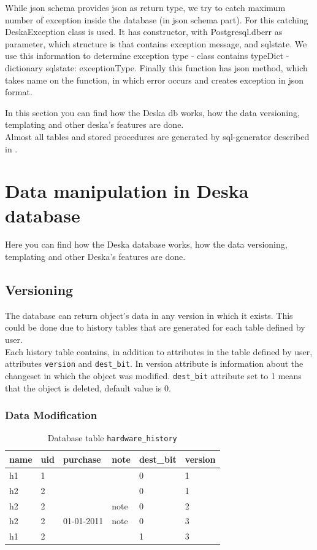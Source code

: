 \documentclass[deska]{subfiles}
\begin{document}
While json schema provides json as return type, we try to catch maximum number of exception inside the database (in
json schema part).
For this catching DeskaException class is used. It has constructor, with Postgresql.dberr as parameter, which structure is that contains exception
message, and sqlstate. We use this information to determine exception type - class contains typeDict - dictionary {sqlstate: exceptionType}.
Finally this function has json method, which takes name on the function, in which error occurs and creates exception in json format.

\label{sec:deska-db}

In this section you can find how the Deska db works, how the data versioning, templating and other deska's features are done.\\
Almost all tables and stored procedures are generated by sql-generator described in .

\section{Data manipulation in Deska database}
\label{sec:deska-db-data-manipulation}
Here you can find how the Deska database works, how the data versioning, templating and other Deska's features are done.

\subsection{Versioning}
\label{sec:versioning}


The database can return object's data in any version in which it exists. This could be done due to history tables that are generated for each table defined by user.\\
Each history table contains, in addition to attributes in the table defined by user, attributes {\tt version} and {\tt dest\_bit}. In version attribute is information about the changeset in which the object was modified. {\tt dest\_bit} attribute set to 1 means that the object is deleted, default value is 0.\\

\subsubsection{Data Modification}

\begin{longtable}{ l | l | l | l | l | l }
    \caption{Database table {\tt hardware\_history}}
    \label{tab:example-hardwarehist} \\
    name & uid & purchase & note & dest\_bit & version\\
    \hline
    \endhead
    h1 & 1 & & & 0 & 1 \\
    h2 & 2 & & & 0 & 1 \\
    h2 & 2 & & note & 0 & 2 \\
    h2 & 2 & 01-01-2011 & note & 0 & 3 \\
    h1 & 2 & & & 1 & 3 \\
    \hline
\end{longtable}
\end{document}
